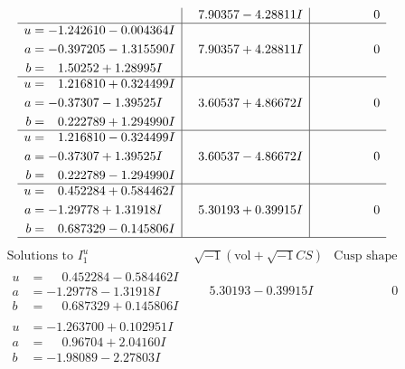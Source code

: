 \documentclass[1p]{elsarticle_modified}
\theoremstyle{definition}
\newcommand{\I}{\sqrt{-1}}
\begin{document}
$$\begin{array}{c|c|c}
 & \phantom{-}7.90357 - 4.28811 I & \phantom{-0.000000 } 0 \\ \hline\begin{aligned}
u &= -1.242610 - 0.004364 I \\
a &= -0.397205 - 1.315590 I \\
b &= \phantom{-}1.50252 + 1.28995 I\end{aligned}
 & \phantom{-}7.90357 + 4.28811 I & \phantom{-0.000000 } 0 \\ \hline\begin{aligned}
u &= \phantom{-}1.216810 + 0.324499 I \\
a &= -0.37307 - 1.39525 I \\
b &= \phantom{-}0.222789 + 1.294990 I\end{aligned}
 & \phantom{-}3.60537 + 4.86672 I & \phantom{-0.000000 } 0 \\ \hline\begin{aligned}
u &= \phantom{-}1.216810 - 0.324499 I \\
a &= -0.37307 + 1.39525 I \\
b &= \phantom{-}0.222789 - 1.294990 I\end{aligned}
 & \phantom{-}3.60537 - 4.86672 I & \phantom{-0.000000 } 0 \\ \hline\begin{aligned}
u &= \phantom{-}0.452284 + 0.584462 I \\
a &= -1.29778 + 1.31918 I \\
b &= \phantom{-}0.687329 - 0.145806 I\end{aligned}
 & \phantom{-}5.30193 + 0.39915 I & \phantom{-0.000000 } 0\\
 \hline 
 \end{array}$$\newpage$$\begin{array}{c|c|c}  
\text{Solutions to }I^u_{1}& \I (\text{vol} + \sqrt{-1}CS) & \text{Cusp shape}\\
 \hline 
\begin{aligned}
u &= \phantom{-}0.452284 - 0.584462 I \\
a &= -1.29778 - 1.31918 I \\
b &= \phantom{-}0.687329 + 0.145806 I\end{aligned}
 & \phantom{-}5.30193 - 0.39915 I & \phantom{-0.000000 } 0 \\ \hline\begin{aligned}
u &= -1.263700 + 0.102951 I \\
a &= \phantom{-}0.96704 + 2.04160 I \\
b &= -1.98089 - 2.27803 I\end{aligned}

\end{array}$$
\end{document}
